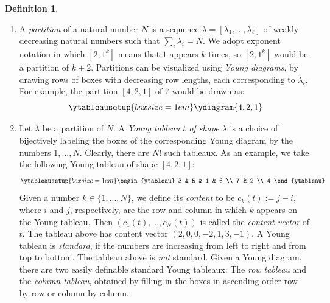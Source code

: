 \documentclass[11pt]{report}
\theoremstyle{definition}
\newtheorem{definition}[theorem]{Definition}
\theoremstyle{remark}
\theoremstyle{remark}
\begin{document}
\begin{definition}
\begin{enumerate}[label=(\roman*)]
\item A \emph{partition} of a natural number $N$ is a sequence $\lambda = [\lambda_1,...,\lambda_\ell]$ of weakly decreasing natural numbers such that $\sum_i \lambda_i = N$. We adopt exponent notation in which $[2,1^k]$ means that $1$ appears $k$ times, so $[2,1^k]$ would be a partition of $k+2$. Partitions can be visualized using \emph{Young diagrams}, by drawing rows of boxes with decreasing row lengths, each corresponding to $\lambda_i$. For example, the partition $[4,2,1]$ of $7$ would be drawn as:
\begin{equation*}
\ytableausetup{boxsize=1em}
\ydiagram{4,2,1}
\end{equation*}
\item Let $\lambda$ be a partition of $N$. A \emph{Young tableau $t$ of shape $\lambda$} is a choice of bijectively labeling the boxes of the corresponding Young diagram by the numbers $1,...,N$. Clearly, there are $N!$ such tableaux. As an example, we take the following Young tableau of shape $[4,2,1]$:
\begin{equation*}
\ytableausetup{boxsize=1em}
\begin{ytableau}
3 & 5 & 1 & 6 \\
7 & 2 \\
4
\end{ytableau}
\end{equation*}
Given a number $k \in \{ 1,...,N \}$, we define its \emph{content} to be $c_k(t) := j-i$, where $i$ and $j$, respectively, are the row and column in which $k$ appears on the Young tableau. Then $(c_1(t),...,c_N(t))$ is called the \emph{content vector} of $t$. The tableau above has content vector $(2,0,0,-2,1,3,-1)$. A Young tableau is \emph{standard}, if the numbers are increasing from left to right and from top to bottom. The tableau above is \emph{not} standard. Given a Young diagram, there are two easily definable standard Young tableaux: The \emph{row  tableau} and the \emph{column tableau}, obtained by filling in the boxes in ascending order row-by-row or column-by-column.

\end{enumerate}
\end{definition}
\end{document}
